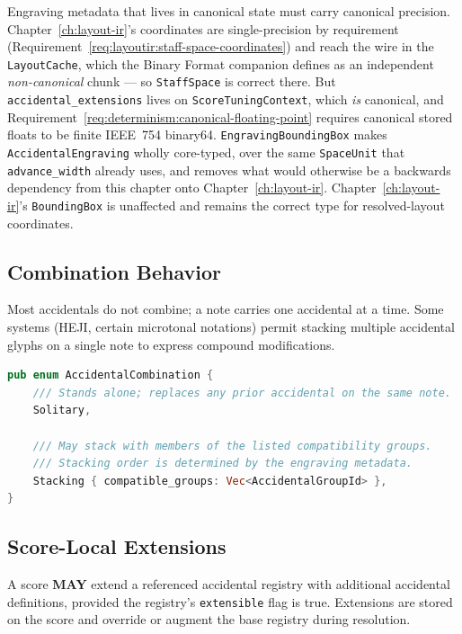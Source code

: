 \documentclass[11pt,letterpaper]{report}
\newcounter{requirement}[chapter]
\newcommand{\MAY}{\textbf{MAY}}
\begin{document}
\begin{rationale}
  Engraving metadata that lives in canonical state must carry canonical
  precision. Chapter~\ref{ch:layout-ir}'s coordinates are
  single-precision by requirement
  (Requirement~\ref{req:layoutir:staff-space-coordinates}) and reach the
  wire in the \texttt{LayoutCache}, which the Binary Format companion
  defines as an independent \emph{non-canonical} chunk --- so
  \texttt{StaffSpace} is correct there. But
  \texttt{accidental\_extensions} lives on
  \texttt{ScoreTuningContext}, which \emph{is} canonical, and
  Requirement~\ref{req:determinism:canonical-floating-point} requires
  canonical stored floats to be finite IEEE~754 binary64.
  \texttt{EngravingBoundingBox} makes \texttt{AccidentalEngraving}
  wholly core-typed, over the same \texttt{SpaceUnit} that
  \texttt{advance\_width} already uses, and removes what would
  otherwise be a backwards dependency from this chapter onto
  Chapter~\ref{ch:layout-ir}. Chapter~\ref{ch:layout-ir}'s
  \texttt{BoundingBox} is unaffected and remains the correct type for
  resolved-layout coordinates.
\end{rationale}

\subsection{Combination Behavior}

Most accidentals do not combine; a note carries one accidental at a
time. Some systems (HEJI, certain microtonal notations) permit stacking
multiple accidental glyphs on a single note to express compound
modifications.

\begin{lstlisting}[language=Rust]
pub enum AccidentalCombination {
    /// Stands alone; replaces any prior accidental on the same note.
    Solitary,

    /// May stack with members of the listed compatibility groups.
    /// Stacking order is determined by the engraving metadata.
    Stacking { compatible_groups: Vec<AccidentalGroupId> },
}
\end{lstlisting}

\subsection{Score-Local Extensions}

A score \MAY{} extend a referenced accidental registry with additional
accidental definitions, provided the registry's \texttt{extensible}
flag is true. Extensions are stored on the score and override or
augment the base registry during resolution.
\end{document}

